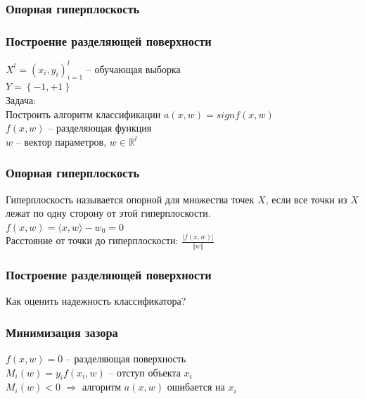 \documentclass[12pt]{beamer}
\begin{document}

\begin{frame}\frametitle{Опорная гиперплоскость}
\end{frame}

\begin{frame}\frametitle{Построение разделяющей поверхности}
${X^l = (x_i,y_i)_{i = 1}^l}$ -- обучающая выборка\\ 
${Y=\left\{-1,+1\right\}}$\\
\vspace{5mm}
Задача:\\
Построить алгоритм классификации ${a(x,w) = sign f(x,w)}$\\\vspace{5mm}
${f(x,w)}$ -- разделяющая функция\\
$w$ -- вектор параметров, $w \in \mathbb{R}^l$
\end{frame}

\begin{frame}\frametitle{Опорная гиперплоскость}
Гиперплоскость называется опорной для множества точек
$X$, если все точки из $X$ лежат по одну сторону от этой гиперплоскости.\\\vspace{5mm}
${f(x,w) = \langle x, w\rangle - w_0 = 0}$\\
\vspace{5mm}
Расстояние от точки до гиперплоскости:
$\frac{\vert f(x,w) \vert}{\Vert w \Vert}$
\end{frame}


\begin{frame}\frametitle{Построение разделяющей поверхности}
Как оценить надежность классификатора?
\end{frame}

\begin{frame}\frametitle{Минимизация зазора}
${f(x,w) = 0}$ -- разделяющая поверхность\\
${M_i(w) =y_if(x_i,w)}$ -- отступ объекта $x_i$\\
${M_i(w)<0}$ $\Rightarrow$ алгоритм $a(x,w)$ ошибается на $x_i$
\end{frame}
\end{document}

